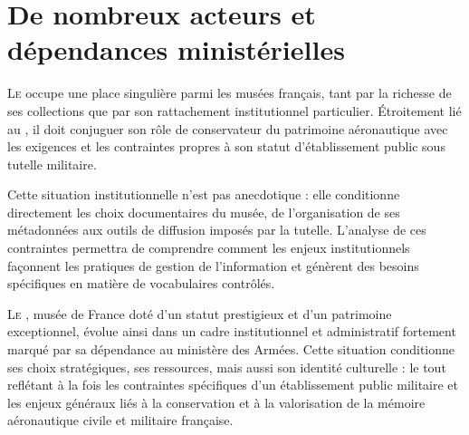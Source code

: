 \chapter[Acteurs et dépendances]{\label{I-B}De nombreux acteurs et dépendances ministérielles }


\lettrine{L}e \maelong occupe une place singulière parmi les musées français, tant par la richesse de ses collections que par son rattachement institutionnel particulier. Étroitement lié au \minarm, il doit conjuguer son rôle de conservateur du patrimoine aéronautique avec les exigences et les contraintes propres à son statut d’établissement public sous tutelle militaire.

Cette situation institutionnelle n'est pas anecdotique : elle conditionne directement les choix documentaires du musée, de l'organisation de ses métadonnées aux outils de diffusion imposés par la tutelle. L'analyse de ces contraintes permettra de comprendre comment les enjeux institutionnels façonnent les pratiques de gestion de l'information et génèrent des besoins spécifiques en matière de vocabulaires contrôlés.





\bigskip
\bigskip
\bigskip

\lettrine{L}{e} \maelong, musée de France doté d’un statut prestigieux et d’un patrimoine exceptionnel, évolue ainsi dans un cadre institutionnel et administratif fortement marqué par sa dépendance au ministère des Armées. Cette situation conditionne ses choix stratégiques, ses ressources, mais aussi son identité culturelle : le tout reflétant à la fois les contraintes spécifiques d’un établissement public militaire et les enjeux généraux liés à la conservation et à la valorisation de la mémoire aéronautique civile et militaire française. 

\bigskip
\bigskip
\bigskip